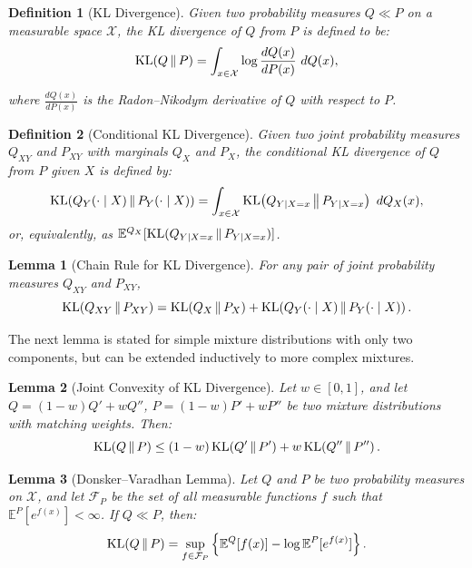 \documentclass{article}
\DeclareMathOperator{\KLop}{KL}
\newcommand{\KL}[2]{%
  \mathchoice
    {\KLop\!\left(#1\,\middle\|\,#2\right)}%
    {\KLop(#1\,\Vert\,#2)}%
    {\KLop(#1\,\Vert\,#2)}%
    {\KLop(#1\,\Vert\,#2)}%
}
\newcommand{\E}{\mathbb{E}}
\newtheorem{lemma}{Lemma}[theorem]
\newtheorem{definition}{Definition}[section]
\begin{document}
\begin{definition}[KL Divergence]
    Given two probability measures $Q \ll P$ on a measurable space $\mathcal{X}$, the KL divergence of $Q$ from $P$ is defined to be:
    \begin{equation*}
        \KL{Q}{P} = \int_{x \in \mathcal{X}} \log \frac{dQ(x)}{dP(x)}~dQ(x),
    \end{equation*}

    where $\frac{dQ(x)}{dP(x)}$ is the Radon--Nikodym derivative of $Q$ with respect to $P$.
\end{definition}

\begin{definition}[Conditional KL Divergence]
    Given two joint probability measures $Q_{XY}$ and $P_{XY}$ with marginals $Q_X$ and $P_X$, the conditional KL divergence of $Q$ from $P$ given $X$ is defined by:
    \begin{equation*}
        \KL{Q_Y(\cdot\mid X)}{P_Y(\cdot \mid X)} = \int_{x \in \mathcal{X}} \KL{Q_{Y\mid X =x}}{P_{Y\mid X=x}} ~dQ_X(x),
    \end{equation*}
    or, equivalently, as $\E^{Q_X}[\KL{Q_{Y|X=x}}{P_{Y\mid X=x}}]$.
    
\end{definition}

\begin{lemma}[Chain Rule for KL Divergence]\label{lem:kl_chain_rule}
    For any pair of joint probability measures $Q_{XY}$ and $P_{XY}$,
    \begin{equation*}
        \KL{Q_{XY}}{P_{XY}} = \KL{Q_X}{P_X} + \KL{Q_Y(\cdot\mid X)}{P_Y(\cdot \mid X)}.
    \end{equation*}
\end{lemma}


The next lemma is stated for simple mixture distributions with only two components, but can be extended inductively to more complex mixtures.
\begin{lemma}[Joint Convexity of KL Divergence]\label{lem:kl_joint_convexity}
    Let $w \in [0,1]$, and let $Q = (1-w)Q' + wQ''$, $P = (1-w)P' + wP''$ be two mixture distributions with matching weights. Then:
    \begin{equation*}
        \KL{Q}{P} \leq (1-w)\KL{Q'}{P'} + w\KL{Q''}{P''}.
    \end{equation*}
\end{lemma}

\begin{lemma}[Donsker--Varadhan Lemma]\label{lem:donsker_varadhan}
    Let $Q$ and $P$ be two probability measures on $\mathcal{X}$, and let $\mathcal{F}_P$ be the set of all measurable functions $f$ such that $\E^P[e^{f(x)}] < \infty$. If $Q \ll P$, then:
    \begin{equation*}
        \KL{Q}{P} = \sup_{f \in \mathcal{F}_P} \left\lbrace \E^Q[f(x)] - \log \E^P[e^{f(x)}] \right\rbrace.
    \end{equation*}
\end{lemma}
\end{document}

